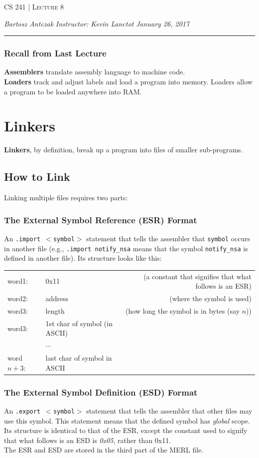 \documentclass{report}
\newcommand{\lectureNum}{8}
\newcommand{\curDate}{January 26, 2017}
\newcommand{\course}{CS 241}
\newcommand{\instructor}{Kevin Lanctot}
\begin{document}
\begin{center}
\begin{Large}
\textsc{\course{} | Lecture \lectureNum{}}
\end{Large}
\end{center} 
\noindent \textit{Bartosz Antczak} \hfill
\textit{Instructor: \instructor{}} \hfill
\textit{\curDate{}}
\rule{\textwidth}{0.4pt}
\subsubsection{Recall from Last Lecture}
\textbf{Assemblers} translate assembly language to machine code. \\
\textbf{Loaders} track and adjust labels and load a program into memory. Loaders allow a program to be loaded anywhere into RAM.
\section{Linkers}
\textbf{Linkers}, by definition, break up a program into files of smaller sub-programs.
\subsection{How to Link}
Linking multiple files requires two parts:
\subsubsection{The External Symbol Reference (ESR) Format}
An \texttt{.import $<$symbol$>$} statement that tells the assembler that \texttt{symbol} occurs in another file (e.g., \texttt{.import notify\_nsa} means that the symbol \texttt{notify\_nsa} is defined in another file). Its structure looks like this:
\begin{center}
\begin{tabular}{ l l r }
word1: & 0x11 & (a constant that signifies that what follows is an ESR) \\
word2: & address & (where the symbol is used) \\
word3: & length & (how long the symbol is in bytes (say $n$)) \\
word3: & 1st char of symbol (in ASCII) & \\
& $\cdots$ & \\
word $n+3$: & last char of symbol in ASCII & 
\end{tabular}
\end{center}
\subsubsection{The External Symbol Definition (ESD) Format}
An \texttt{.export $<$symbol$>$} statement that tells the assembler that other files may use this symbol. This statement means that the defined symbol has \textit{global} scope. Its structure is identical to that of the ESR, except the constant used to signify that what follows is an ESD is \textit{0x05}, rather than 0x11.\\
The ESR and ESD are stored in the third part of the MERL file.
\end{document}
